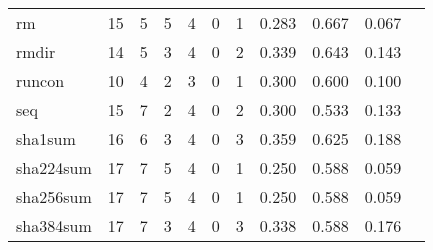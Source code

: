 \begin{longtable}{lp{1.10cm}p{1.10cm}p{1.10cm}p{1.10cm}p{1.10cm}p{1.10cm}p{1.10cm}p{1.10cm}p{1.10cm}p{1.10cm}}
rm        &                     15 &                                  5 &                                 5 &                                4 &                                 0 &                               1 &                          0.283 &                                 0.667 &                               0.067 \\
rmdir     &                     14 &                                  5 &                                 3 &                                4 &                                 0 &                               2 &                          0.339 &                                 0.643 &                               0.143 \\
runcon    &                     10 &                                  4 &                                 2 &                                3 &                                 0 &                               1 &                          0.300 &                                 0.600 &                               0.100 \\
seq       &                     15 &                                  7 &                                 2 &                                4 &                                 0 &                               2 &                          0.300 &                                 0.533 &                               0.133 \\
sha1sum   &                     16 &                                  6 &                                 3 &                                4 &                                 0 &                               3 &                          0.359 &                                 0.625 &                               0.188 \\
sha224sum &                     17 &                                  7 &                                 5 &                                4 &                                 0 &                               1 &                          0.250 &                                 0.588 &                               0.059 \\
sha256sum &                     17 &                                  7 &                                 5 &                                4 &                                 0 &                               1 &                          0.250 &                                 0.588 &                               0.059 \\
sha384sum &                     17 &                                  7 &                                 3 &                                4 &                                 0 &                               3 &                          0.338 &                                 0.588 &                               0.176 \\

\end{longtable}
